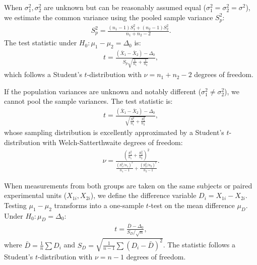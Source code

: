 \begin{teorema}
	When $\sigma_1^2, \sigma_2^2$ are unknown but can be reasonably assumed equal ($\sigma_1^2 = \sigma_2^2 = \sigma^2$), we estimate the common variance using the pooled sample variance $S_p^2$:
	\begin{align}
		S_p^2 = \frac{(n_1 - 1)S_1^2 + (n_2 - 1)S_2^2}{n_1 + n_2 - 2}.
	\end{align}
	The test statistic under $H_0: \mu_1 - \mu_2 = \Delta_0$ is:
	\begin{align}
		t = \frac{(\bar{X}_1 - \bar{X}_2) - \Delta_0}{S_p \sqrt{\frac{1}{n_1} + \frac{1}{n_2}}},
	\end{align}
	which follows a Student's $t$-distribution with $\nu = n_1 + n_2 - 2$ degrees of freedom.
\end{teorema}

\begin{teorema}
	If the population variances are unknown and notably different ($\sigma_1^2 \neq \sigma_2^2$), we cannot pool the sample variances. The test statistic is:
	\begin{align}
		t = \frac{(\bar{X}_1 - \bar{X}_2) - \Delta_0}{\sqrt{\frac{S_1^2}{n_1} + \frac{S_2^2}{n_2}}},
	\end{align}
	whose sampling distribution is excellently approximated by a Student's $t$-distribution with Welch-Satterthwaite degrees of freedom:
	\begin{align}
		\nu = \frac{\left( \frac{S_1^2}{n_1} + \frac{S_2^2}{n_2} \right)^2}{\frac{\left(S_1^2/n_1\right)^2}{n_1 - 1} + \frac{\left(S_2^2/n_2\right)^2}{n_2 - 1}}.
	\end{align}
\end{teorema}

\begin{definicion}
	When measurements from both groups are taken on the same subjects or paired experimental units ($X_{1i}, X_{2i}$), we define the difference variable $D_i = X_{1i} - X_{2i}$. Testing $\mu_1 - \mu_2$ transforms into a one-sample $t$-test on the mean difference $\mu_D$. Under $H_0: \mu_D = \Delta_0$:
	\begin{align}
		t = \frac{\bar{D} - \Delta_0}{S_D / \sqrt{n}},
	\end{align}
	where $\bar{D} = \frac{1}{n}\sum D_i$ and $S_D = \sqrt{\frac{1}{n-1}\sum (D_i - \bar{D})^2}$. The statistic follows a Student's $t$-distribution with $\nu = n - 1$ degrees of freedom.
\end{definicion}
